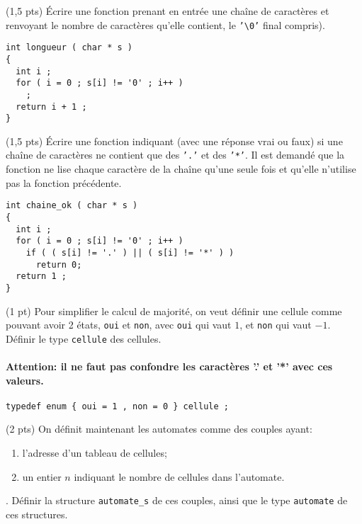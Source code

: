 \vspace*{1em}

\question (1,5 pts) Écrire une fonction prenant en entrée une chaîne de
caractères et renvoyant le nombre de caractères qu'elle contient, le
\texttt{'\textbackslash 0'} final compris).

\begin{solution}
  \begin{lstlisting}
int longueur ( char * s )
{
  int i ;
  for ( i = 0 ; s[i] != '0' ; i++ )
    ;
  return i + 1 ;
}    
  \end{lstlisting}
\end{solution}


\question (1,5 pts) Écrire une fonction indiquant (avec une réponse vrai
ou faux) si une chaîne de caractères ne contient que des \texttt{'.'}
et des \texttt{'*'}. Il est demandé que la fonction ne lise chaque caractère
de la chaîne qu'une seule fois et qu'elle n'utilise pas la fonction précédente.

\begin{solution}
  \begin{lstlisting}
int chaine_ok ( char * s )
{
  int i ;
  for ( i = 0 ; s[i] != '0' ; i++ )
    if ( ( s[i] != '.' ) || ( s[i] != '*' ) )
      return 0;
  return 1 ;
}    
  \end{lstlisting}
\end{solution}

\question (1 pt) Pour simplifier le calcul de majorit{\'e}, on veut
d{\'e}finir une cellule comme pouvant avoir 2 {\'e}tats, \texttt{oui}
et \texttt{non}, avec \texttt{oui} qui vaut $1$, et \texttt{non} qui
vaut $-1$. D{\'e}finir le type \texttt{cellule} des
cellules. \paragraph{Attention: il ne faut pas confondre les
  caractères '.' et '*' avec ces valeurs.}

\begin{solution}
  \begin{lstlisting}
typedef enum { oui = 1 , non = 0 } cellule ; 
  \end{lstlisting}
\end{solution}


\question (2 pts) On d{\'e}finit maintenant les automates comme des
couples ayant:
\begin{enumerate}
\item l'adresse d'un tableau de cellules;
\item un entier $n$ indiquant le nombre de cellules dans l'automate.
\end{enumerate}.
D{\'e}finir la structure \texttt{automate\_s} de ces couples, ainsi que le type 
\texttt{automate} de ces structures.

